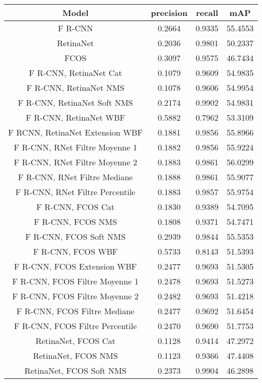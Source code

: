 \documentclass{article}
\begin{document}
\begin{table}[h!]
\centering
\begin{tabular}{|c||c|c|c|} 
\hline
Model & precision & recall & mAP \\ 
\hline
F R-CNN & 0.2664 & 0.9335 & 55.4553 \\ 
\hline
RetinaNet & 0.2036 & 0.9801 & 50.2337 \\ 
\hline
FCOS & 0.3097 & 0.9575 & 46.7434 \\ 
\hline
F R-CNN, RetinaNet Cat & 0.1079 & 0.9609 & 54.9835 \\ 
\hline
F R-CNN, RetinaNet NMS & 0.1078 & 0.9606 & 54.9954 \\ 
\hline
F R-CNN, RetinaNet Soft NMS & 0.2174 & 0.9902 & 54.9831 \\ 
\hline
F R-CNN, RetinaNet WBF & 0.5882 & 0.7962 & 53.3109 \\ 
\hline
F RCNN, RetinaNet Extension WBF & 0.1881 & 0.9856 & 55.8966 \\ 
\hline
F R-CNN, RNet Filtre Moyenne 1 & 0.1882 & 0.9856 & 55.9224 \\ 
\hline
F R-CNN, RNet Filtre Moyenne 2 & 0.1883 & 0.9861 & 56.0299 \\ 
\hline
F R-CNN, RNet Filtre Mediane & 0.1888 & 0.9861 & 55.9077 \\ 
\hline
F R-CNN, RNet Filtre Percentile & 0.1883 & 0.9857 & 55.9754 \\ 
\hline
F R-CNN, FCOS Cat & 0.1830 & 0.9389 & 54.7095 \\ 
\hline
F R-CNN, FCOS NMS & 0.1808 & 0.9371 & 54.7471 \\ 
\hline
F R-CNN, FCOS Soft NMS & 0.2939 & 0.9844 & 55.5353 \\ 
\hline
F R-CNN, FCOS WBF & 0.5733 & 0.8143 & 51.5393 \\ 
\hline
F R-CNN, FCOS Extension WBF & 0.2477 & 0.9693 & 51.5305 \\ 
\hline
F R-CNN, FCOS Filtre Moyenne 1 & 0.2478 & 0.9693 & 51.5273 \\ 
\hline
F R-CNN, FCOS Filtre Moyenne 2 & 0.2482 & 0.9693 & 51.4218 \\ 
\hline
F R-CNN, FCOS Filtre Mediane & 0.2477 & 0.9692 & 51.6454 \\ 
\hline
F R-CNN, FCOS Filtre Percentile & 0.2470 & 0.9690 & 51.7753 \\ 
\hline
RetinaNet, FCOS Cat & 0.1128 & 0.9414 & 47.2972 \\ 
\hline
RetinaNet, FCOS NMS & 0.1123 & 0.9366 & 47.4408 \\ 
\hline
RetinaNet, FCOS Soft NMS & 0.2373 & 0.9904 & 46.2898 \\ 

\end{tabular}
\end{table}
\end{document}
